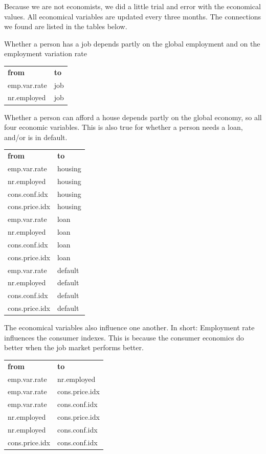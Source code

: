 \documentclass[11pt,]{article}
\begin{document}
\begin{multicols}{2}
Because we are not economists, we did a little trial and error with the
economical values. All economical variables are updated every three
months. The connections we found are listed in the tables below.

Whether a person has a job depends partly on the global employment and
on the employment variation rate

\medskip
\begin{tabular}{ll}
    \textbf{from} & \textbf{to} \\
    emp.var.rate & job\\
    nr.employed & job 
\end{tabular}

\medskip

Whether a person can afford a house depends partly on the global
economy, so all four economic variables. This is also true for whether a
person needs a loan, and/or is in default.

\bigskip
\begin{tabular}{ll}
    \textbf{from} & \textbf{to} \\
    emp.var.rate & housing \\
    nr.employed & housing \\ 
    cons.conf.idx & housing \\ 
    \medskip
    cons.price.idx & housing \\ 
    emp.var.rate & loan \\
    nr.employed & loan \\ 
    cons.conf.idx & loan \\ 
    \medskip
    cons.price.idx & loan \\
    emp.var.rate & default \\
    nr.employed & default \\ 
    cons.conf.idx & default \\ 
    cons.price.idx & default \\ 
\end{tabular}

\bigskip

The economical variables also influence one another. In short:
Employment rate influences the consumer indexes. This is because the
consumer economics do better when the job market performs better.

\medskip
\begin{tabular}{ll}
    \textbf{from} & \textbf{to} \\
    emp.var.rate & nr.employed \\
    emp.var.rate & cons.price.idx \\
    emp.var.rate & cons.conf.idx \\
    nr.employed & cons.price.idx \\ 
    nr.employed & cons.conf.idx \\ 
    cons.price.idx & cons.conf.idx \\ 
\end{tabular}


\end{multicols}
\end{document}

